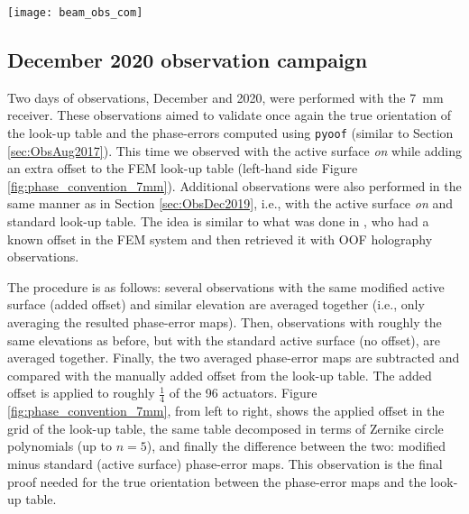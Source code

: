 \documentclass[
    ]
    {aa}
\begin{document}
    \begin{figure*}
        \centering
        \texttt{[image: beam\_obs\_com]}
        \caption{Observed (December 2019) and computed power patterns. The upper row corresponds to the 3C84 observed beam, using the \SI{7}{\mm} receiver at a mean elevation of \SI{48}{\deg} (azimuth scans). The lower row shows the best fit for an $n=5$. The observed centered beam has a signal-to-noise ratio of 610.}
        \label{fig:beam_obs_com}
    \end{figure*}

    \subsection{December 2020 observation campaign} \label{sec:ObsDec2020}

    Two days of observations, December  and  2020, were performed with the \SI{7}{\mm} receiver. These observations aimed to validate once again the true orientation of the look-up table and the phase-errors computed using \texttt{pyoof} (similar to Section \ref{sec:ObsAug2017}).
    This time we observed with the active surface \textit{on} while adding an extra offset to the FEM look-up table (left-hand side Figure \ref{fig:phase_convention_7mm}). Additional observations were also performed in the same manner as in Section \ref{sec:ObsDec2019}, i.e., with the active surface \textit{on} and standard look-up table.
    The idea is similar to what was done in \citet{2007A&A...465..685N}, who had a known offset in the FEM system and then retrieved it with OOF holography observations.

    The procedure is as follows: several observations with the same modified active surface (added offset) and similar elevation are averaged together (i.e., only averaging the resulted phase-error maps). Then, observations with roughly the same elevations as before, but with the standard active surface (no offset), are averaged together. Finally, the two averaged phase-error maps are subtracted and compared with the manually added offset from the look-up table. The added offset is applied to roughly $\frac{1}{4}$ of the \num{96} actuators. Figure \ref{fig:phase_convention_7mm}, from left to right, shows the applied offset in the grid of the look-up table, the same table decomposed in terms of Zernike circle polynomials (up to $n=5$), and finally the difference between the two: modified minus standard (active surface) phase-error maps. This observation is the final proof needed for the true orientation between the phase-error maps and the look-up table.
\end{document}
